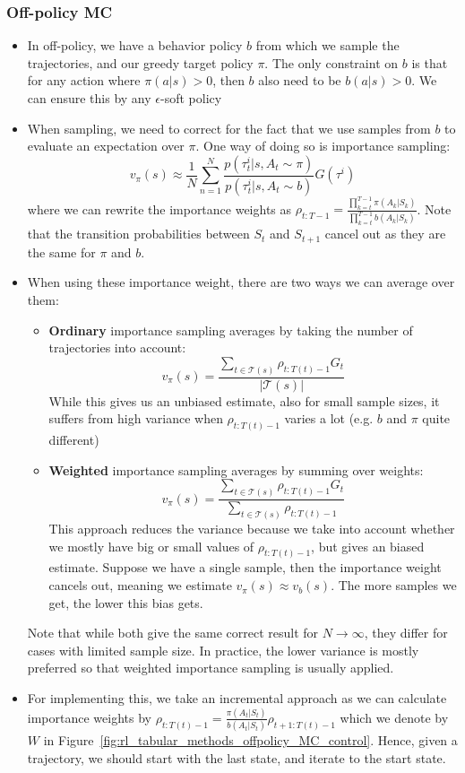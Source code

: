\subsubsection{Off-policy MC}
\begin{itemize}
	\item In off-policy, we have a behavior policy $b$ from which we sample the trajectories, and our greedy target policy $\pi$. The only constraint on $b$ is that for any action where $\pi(a|s)>0$, then $b$ also need to be $b(a|s)>0$. We can ensure this by any $\epsilon$-soft policy
	\item When sampling, we need to correct for the fact that we use samples from $b$ to evaluate an expectation over $\pi$. One way of doing so is importance sampling:
	$$v_{\pi}(s) \approx \frac{1}{N}\sum_{n=1}^{N} \frac{p(\tau^{i}_t|s,A_t\sim\pi)}{p(\tau^{i}_t|s,A_t\sim b)} G(\tau^{i})$$
	where we can rewrite the importance weights as $\rho_{t:T-1}=\frac{\prod_{k=t}^{T-1}\pi(A_k|S_k)}{\prod_{k=t}^{T-1}b(A_k|S_k)}$. Note that the transition probabilities between $S_{t}$ and $S_{t+1}$ cancel out as they are the same for $\pi$ and $b$.
	\item When using these importance weight, there are two ways we can average over them:
	\begin{itemize}
		\item \textbf{Ordinary} importance sampling averages by taking the number of trajectories into account:
		$$v_{\pi}(s)=\frac{\sum_{t\in\mathcal{T}(s)}\rho_{t:T(t)-1}G_t}{|\mathcal{T}(s)|}$$
		While this gives us an unbiased estimate, also for small sample sizes, it suffers from high variance when $\rho_{t:T(t)-1}$ varies a lot (e.g. $b$ and $\pi$ quite different)
		\item \textbf{Weighted} importance sampling averages by summing over weights:
		$$v_{\pi}(s)=\frac{\sum_{t\in\mathcal{T}(s)}\rho_{t:T(t)-1}G_t}{\sum_{t\in\mathcal{T}(s)}\rho_{t:T(t)-1}}$$
		This approach reduces the variance because we take into account whether we mostly have big or small values of $\rho_{t:T(t)-1}$, but gives an biased estimate. Suppose we have a single sample, then the importance weight cancels out, meaning we estimate $v_{\pi}(s)\approx v_{b}(s)$. The more samples we get, the lower this bias gets.
	\end{itemize}
	Note that while both give the same correct result for $N\to\infty$, they differ for cases with limited sample size. In practice, the lower variance is mostly preferred so that weighted importance sampling is usually applied.
	\item For implementing this, we take an incremental approach as we can calculate importance weights by $\rho_{t:T(t)-1}=\frac{\pi(A_t|S_t)}{b(A_t|S_t)}\rho_{t+1:T(t)-1}$ which we denote by $W$ in Figure~\ref{fig:rl_tabular_methods_offpolicy_MC_control}. Hence, given a trajectory, we should start with the last state, and iterate to the start state.
	

\end{itemize}
